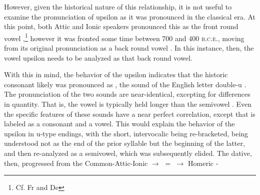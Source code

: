 However, given the historical nature of this relationship, it is not
useful to examine the pronunciation of upsilon  as it was
pronounced in the classical era. At this point, both Attic and
Ionic speakers pronounced this as the front round vowel ,\footnote{Cf. Fr  and De } however it
was fronted some time between 700 and 400 \textsc{b.c.e.}, moving
from its original pronunciation as a back round vowel .\autocite[529]{malikouti-drachman_bortone_2015}
In this instance, then, the vowel upsilon  needs to be
analyzed as that back round vowel. 



With this in mind, the behavior of the upsilon  indicates
that the historic consonant likely was pronounced as ,
the sound of the English letter double-u . 
The pronunciation of the two sounds are near-identical, excepting
for differences in quantity. That is, the vowel  is typically
held longer than the semivowel . Even the specific features
of these sounds have a near perfect correlation,
except that  is labeled as a consonant and  a vowel.
This would explain the behavior of the upsilon  in u-type
endings, with the short, intervocalic  being re-bracketed, being
understood not as the end of the prior syllable but the beginning of the
latter, and then re-analyzed as a semivowel, which was subsequently elided.
The dative, then, progressed from the Common-Attic-Ionic
 $\to$
 $=$
 $\to$ Homeric
-

